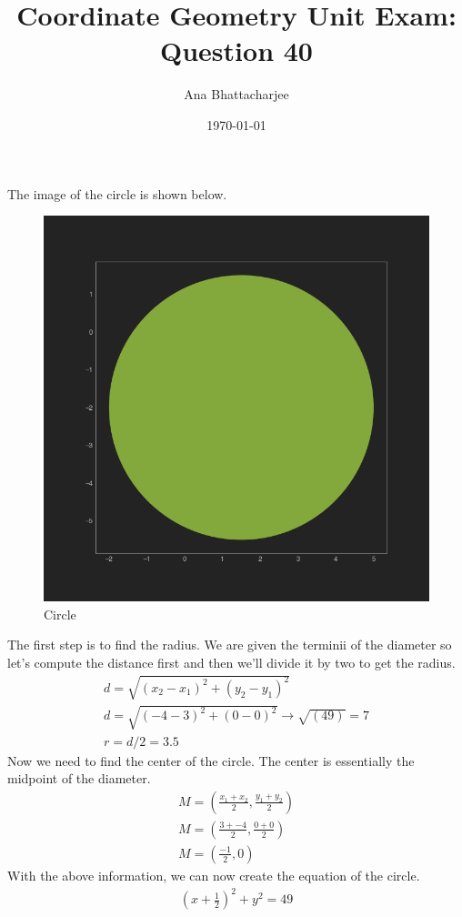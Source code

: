 \documentclass{article}
\begin{document}
\title{Coordinate Geometry Unit Exam: Question 40}
\author{Ana Bhattacharjee}
\date{\today}
\maketitle{}

\begin{center}
The image of the circle is shown below.
\begin{figure}[!htbp]
  \includegraphics[width=1.0\columnwidth]{circle}
  \caption{Circle}
\end{figure}
\par
The first step is to find the radius. We are given the terminii of the diameter so let's compute the distance first and then we'll divide it by two to get the radius.
\begin{align}
  d = \sqrt{(x_2 - x_1)^2 + (y_2 - y_1)^2} \\
  d = \sqrt{(-4 - 3)^2 + (0 - 0)^2} \rightarrow \sqrt{(49)} = 7 \\
  r = d / 2 = 3.5
\end{align}
Now we need to find the center of the circle. The center is essentially the midpoint of the diameter.
\begin{align}
  M = (\frac{x_1 + x_2}{2}, \frac{y_1 + y_2}{2}) \\
  M = (\frac{3 + -4}{2}, \frac{0 + 0 }{2}) \\
  M = (\frac{-1}{2}, 0)
\end{align}
With the above information, we can now create the equation of the circle.
\begin{align}
  (x + \frac{1}{2})^2 + y^2 = 49 
\end{align}
\end{center}
\end{document}
